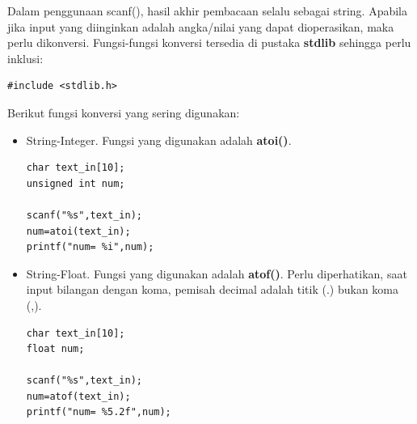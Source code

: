 \documentclass[12pt,]{article}
\begin{document}
	Dalam penggunaan scanf(), hasil akhir pembacaan selalu sebagai string.
	Apabila jika input yang diinginkan adalah angka/nilai yang dapat dioperasikan, maka perlu dikonversi.
	Fungsi-fungsi konversi tersedia di pustaka \textbf{stdlib} sehingga perlu inklusi:
	\begin{verbatim}
#include <stdlib.h>
	\end{verbatim}

	Berikut fungsi konversi yang sering digunakan:
	\begin{itemize}
		\item String-Integer. Fungsi yang digunakan adalah \textbf{atoi()}.
		\begin{verbatim}
char text_in[10];
unsigned int num;

scanf("%s",text_in);
num=atoi(text_in);
printf("num= %i",num);
		\end{verbatim}

		\item String-Float. Fungsi yang digunakan adalah \textbf{atof()}.
		Perlu diperhatikan, saat input bilangan dengan koma, pemisah decimal adalah titik (.) bukan koma (,).
		\begin{verbatim}
char text_in[10];
float num;

scanf("%s",text_in);
num=atof(text_in);
printf("num= %5.2f",num);
		\end{verbatim}

	\end{itemize}
\end{document}
